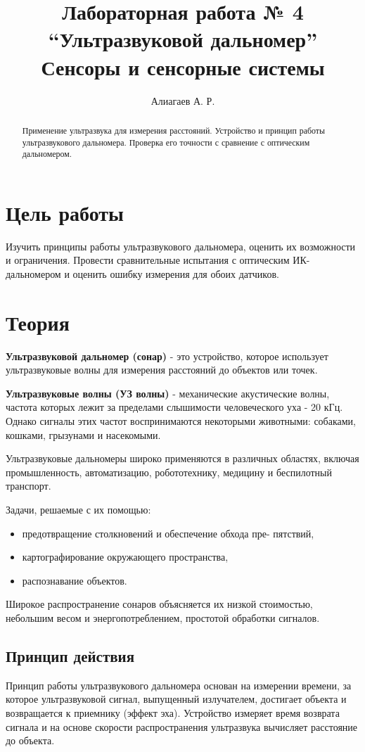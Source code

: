 \documentclass[12pt]{article}
\title{Лабораторная работа № 4 \\
``Ультразвуковой дальномер'' \\
\large Сенсоры и сенсорные системы}
\author{Алиагаев А. Р.}
\begin{document}
\maketitle
\tableofcontents
\begin{abstract}
    Применение ультразвука для измерения расстояний. Устройство и принцип работы ультразвукового дальномера. Проверка его точности с сравнение с оптическим дальномером.
\end{abstract}

\section{Цель работы}
Изучить принципы работы ультразвукового дальномера, оценить их возможности и ограничения. Провести сравнительные испытания с оптическим ИК-дальномером и оценить ошибку измерения для обоих датчиков.

\section{Теория}
\textbf{Ультразвуковой дальномер (сонар)} - это устройство, которое использует ультразвуковые волны для измерения расстояний до объектов или точек. 

\textbf{Ультразвуковые волны (УЗ волны)} - механические акустические волны, частота которых лежит за пределами слышимости человеческого уха - 20 кГц. Однако сигналы этих частот воспринимаются некоторыми животными: собаками, кошками, грызунами и насекомыми.

Ультразвуковые дальномеры широко применяются в различных областях, включая промышленность, автоматизацию, робототехнику, медицину и беспилотный транспорт.

Задачи, решаемые с их помощью:
\begin{itemize}
	\item предотвращение столкновений и обеспечение обхода пре-
	пятствий,
	\item картографирование окружающего пространства,
	\item распознавание объектов.
\end{itemize}

Широкое распространение сонаров объясняется их низкой стоимостью, небольшим весом и энергопотреблением, простотой обработки сигналов.

\subsection{Принцип действия}
 Принцип работы ультразвукового дальномера основан на измерении времени, за которое ультразвуковой сигнал, выпущенный излучателем, достигает объекта и возвращается к приемнику (эффект эха). Устройство измеряет время возврата сигнала и на основе скорости распространения ультразвука вычисляет расстояние до объекта. 
 
\end{document}
